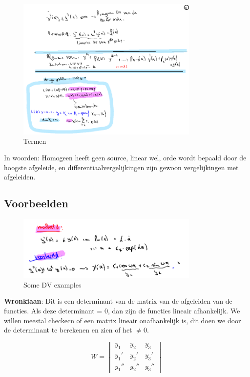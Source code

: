 \documentclass[a4paper]{report}
\begin{document}
\begin{figure}[H]
	\centering
	\includegraphics[width=0.8\textwidth]{assets/termen_hf5.png}
	\caption{Termen}
	\label{fig:termen_hf5}
\end{figure}

In woorden: Homogeen heeft geen source, linear wel, orde wordt bepaald door de hoogste afgeleide, en differentiaalvergelijkingen zijn gewoon vergelijkingen met afgeleiden.

\subsection{Voorbeelden}

\begin{figure}[H]
	\centering
	\includegraphics[width=0.8\textwidth]{assets/some_DV_examples.png}
	\caption{Some DV examples}
	\label{fig:some_dv_examples}
\end{figure}

\textbf{Wronkiaan}: Dit is een determinant van de matrix van de afgeleiden van de functies. Als deze determinant = 0, dan zijn de functies lineair afhankelijk.
We willen meestal checkecn of een matrix lineair onafhankelijk is, dit doen we door de determinant te berekenen en zien of het $\neq 0$.

$$ W = \begin{vmatrix} y_1 & y_2 & y_3 \\ y_1' & y_2' & y_3' \\ y_1'' & y_2'' & y_3'' \end{vmatrix} $$
\end{document}
